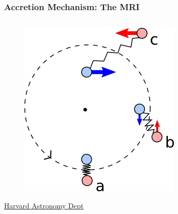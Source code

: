 \documentclass[hyperref={pdfpagelabels=false}]{beamer}
\begin{document}
\begin{frame}
\begin{columns}
\begin{column}{0.5\textwidth}
\begin{figure}
      \end{figure}
    \end{column}
  \end{columns}
\end{frame}

\begin{frame}
\frametitle{Accretion Mechanism: The MRI}
  \begin{columns}
  \centering
    \begin{column}{0.5\textwidth}
      \begin{figure}
        \includegraphics[scale=0.5]{images/MRI.jpg}
      \end{figure}
      \begin{center}
        \href{https://ay201b.wordpress.com/2011/04/11/the-magnetorotational-instability/}{{\tiny Harvard Astronomy Dept}}
      \end{center}
    \end{column}
    \begin{column}{0.5\textwidth}

\end{column}
\end{columns}
\end{frame}
\end{document}
